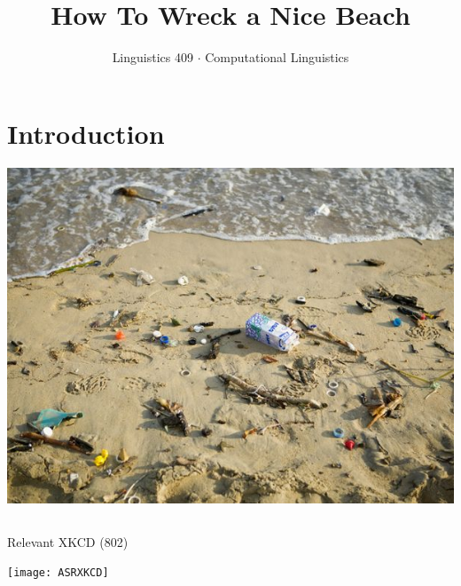 \documentclass[9pt,xcolor=pdftex,dvipsnames,table]{beamer}
\title{How To Wreck a Nice Beach}
\author{Linguistics 409 $\cdot$ Computational Linguistics}
\date{}
\begin{document}

\section{Introduction}

\begin{frame}

	\titlepage
	\vspace{-1.5cm}
	\begin{center}
    \includegraphics[scale=.38]{niceBeach.jpg}
	\end{center}
	
\end{frame}

\subsection{}
\begin{frame}{Relevant XKCD (802)}

	\begin{center}
    \texttt{[image: ASRXKCD]}
	\end{center}
	
\end{frame}
\end{document}
